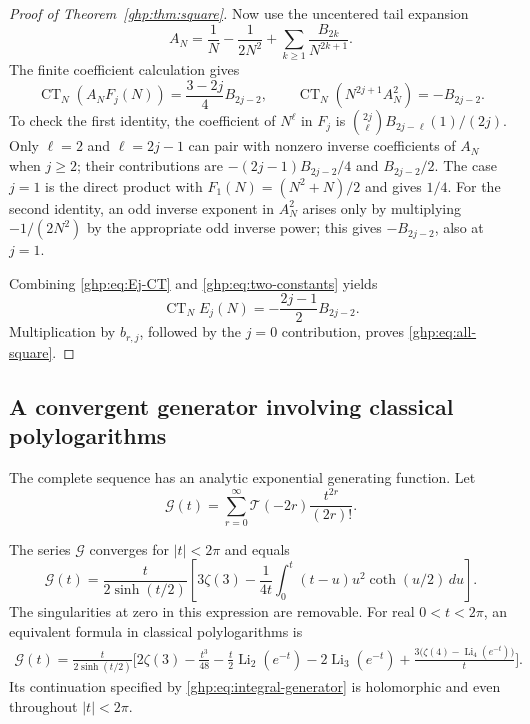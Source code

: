 \begin{proof}[Proof of Theorem~\ref{ghp:thm:square}]
Now use the uncentered tail expansion
\[
 A_N=\frac1N-\frac1{2N^2}
                  +\sum_{k\geq1}\frac{B_{2k}}{N^{2k+1}}.
\]
The finite coefficient calculation gives
\begin{equation}\label{ghp:eq:two-constants}
 \operatorname{CT}_N(A_NF_j(N))
      =\frac{3-2j}{4}B_{2j-2},\qquad
 \operatorname{CT}_N(N^{2j+1}A_N^2)=-B_{2j-2}.
\end{equation}
To check the first identity, the coefficient of $N^\ell$ in $F_j$
is $\binom{2j}{\ell}B_{2j-\ell}(1)/(2j)$. Only $\ell=2$ and
$\ell=2j-1$ can pair with nonzero inverse coefficients of $A_N$
when $j\geq2$; their contributions are
$-(2j-1)B_{2j-2}/4$ and $B_{2j-2}/2$. The case $j=1$ is the direct
product with $F_1(N)=(N^2+N)/2$ and gives $1/4$.
For the second identity, an odd inverse exponent in $A_N^2$ arises
only by multiplying $-1/(2N^2)$ by the appropriate odd inverse power;
this gives $-B_{2j-2}$, also at $j=1$.

Combining \eqref{ghp:eq:Ej-CT} and \eqref{ghp:eq:two-constants} yields
\[
 \operatorname{CT}_NE_j(N)=-\frac{2j-1}{2}B_{2j-2}.
\]
Multiplication by $b_{r,j}$, followed by the $j=0$ contribution,
proves \eqref{ghp:eq:all-square}.
\end{proof}

\subsection{A convergent generator involving classical polylogarithms}

The complete sequence has an analytic exponential generating function.
Let
\[
 \mathcal G(t)=\sum_{r=0}^{\infty}
               \mathcal T(-2r)\frac{t^{2r}}{(2r)!}.
\]

\begin{theorem}\label{ghp:thm:generator}
The series $\mathcal G$ converges for $|t|<2\pi$ and equals
\begin{equation}\label{ghp:eq:integral-generator}
 \mathcal G(t)=\frac{t}{2\sinh(t/2)}
   \left[3\zeta(3)-\frac1{4t}
       \int_0^t(t-u)u^2\coth(u/2)\,du\right].
\end{equation}
The singularities at zero in this expression are removable. For
real $0<t<2\pi$, an equivalent formula in classical polylogarithms is
\begin{align}\label{ghp:eq:polylog-generator}
 \mathcal G(t)=\frac{t}{2\sinh(t/2)}\bigg[
 2\zeta(3)-\frac{t^3}{48}
 -\frac t2\operatorname{Li}_2(e^{-t})
 -2\operatorname{Li}_3(e^{-t})
 +\frac{3\bigl(\zeta(4)-\operatorname{Li}_4(e^{-t})\bigr)}t
 \bigg].
\end{align}
Its continuation specified by \eqref{ghp:eq:integral-generator} is
holomorphic and even throughout $|t|<2\pi$.
\end{theorem}

